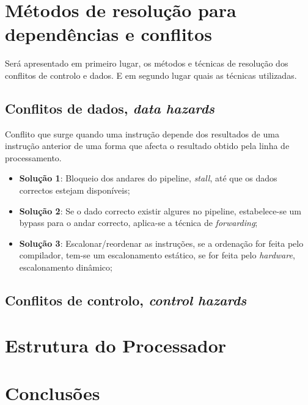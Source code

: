 \documentclass[11pt]{article}
\numberwithin{equation}{section}
\begin{document}
\section{Métodos de resolução para dependências e conflitos}


Será apresentado em primeiro lugar, os métodos e técnicas de resolução dos conflitos de controlo e dados. E em segundo lugar quais as técnicas utilizadas.


\subsection{Conflitos de dados, \textit{data hazards}}
Conflito que surge quando uma instrução depende dos	resultados de uma instrução anterior de uma forma que afecta o resultado obtido pela linha de processamento.

\begin{itemize}
	\item \textbf{Solução 1}: Bloqueio dos andares do pipeline, \textit{stall}, até que os dados correctos estejam disponíveis;
	\item \textbf{Solução 2}: Se o dado correcto existir algures no pipeline, estabelece-se um bypass para o andar correcto, aplica-se a técnica de \textit{forwarding};
	\vspace{-2.5mm}
	\item \textbf{Solução 3}: Escalonar/reordenar as instruções, se a ordenação for feita pelo compilador, tem-se um escalonamento estático, se for feita pelo \textit{hardware}, escalonamento dinâmico;
\end{itemize}



\subsection{Conflitos de controlo, \textit{control hazards}}

\section{Estrutura do Processador}

\section{Conclusões}

\pagebreak

\listoftodos
\end{document}
